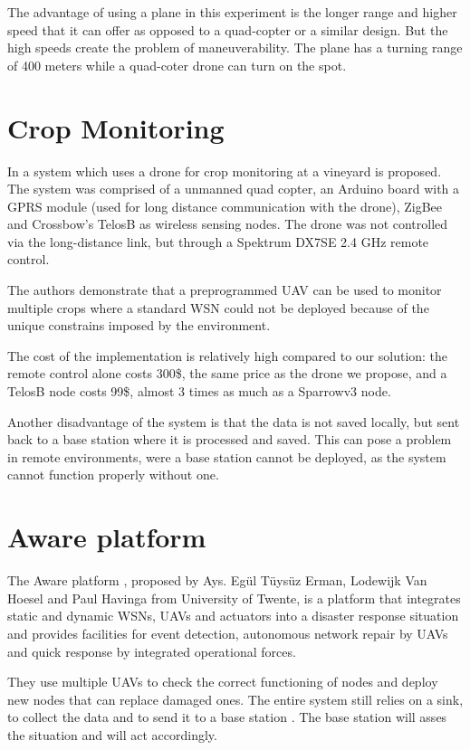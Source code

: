 The advantage of using a plane in this experiment is the longer range and higher speed that it can offer as opposed to a quad-copter or a similar design.  But the high speeds create the problem of maneuverability. The plane has a turning range of 400 meters while a quad-coter drone can turn on the spot.

\section{Crop Monitoring}

In \cite{valente2011air} a system which uses a drone for crop monitoring at a vineyard is proposed. The system was comprised of a unmanned quad copter, an Arduino board with a GPRS module (used for long distance communication with  the drone), ZigBee and Crossbow’s TelosB as wireless sensing nodes. The drone was not controlled via the long-distance link, but through a Spektrum DX7SE 2.4 GHz remote control.

The authors demonstrate that a preprogrammed UAV can be used to monitor multiple crops where a standard WSN could not be deployed because of the unique constrains imposed by the environment.

The cost of the implementation is relatively high compared to our solution: the remote control alone costs 300\$, the same price as the drone we propose, and a TelosB node costs 99\$, almost 3 times as much as a Sparrowv3 node.

Another disadvantage of the system is that the data is not saved locally, but sent back to a base station where it is processed and saved. This can pose a problem in remote environments, were a base station cannot be deployed, as the system cannot function properly without one.

\section{Aware platform}

The Aware platform \cite{ollero2007aware}, proposed by Ays. Egül Tüysüz Erman, Lodewijk Van Hoesel and Paul Havinga from University of Twente, is a platform that integrates static and dynamic WSNs, UAVs and actuators into a disaster response situation and provides facilities for event detection, autonomous network repair by UAVs and quick response by integrated operational forces.

They use multiple UAVs to check the correct functioning of nodes and deploy new nodes that can replace damaged ones. The entire system still relies on a sink, to collect the data and to send it to a base station \cite{erman2008enabling}. The base station will asses the situation and will act accordingly.
